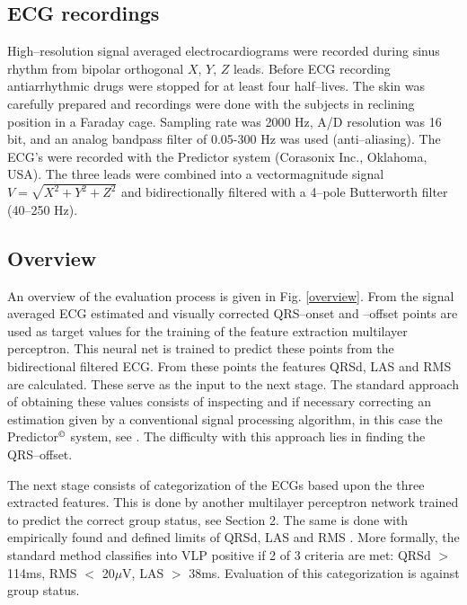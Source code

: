 \documentclass[twocolumn]{cinc}
\begin{document}
\subsection{ECG recordings}
High--resolution signal averaged electrocardiograms  
were recorded during sinus rhythm from bipolar orthogonal $X$, $Y$, $Z$ leads. 
Before ECG recording antiarrhythmic drugs were stopped for at least four half--lives.
The skin was carefully prepared and recordings were done with the subjects in reclining 
position in a Faraday cage. Sampling rate was 2000 Hz, A/D resolution was 16 bit, and an 
analog bandpass filter of 0.05-300 Hz was used (anti--aliasing).  The ECG's were recorded 
with the Predictor system (Corasonix Inc., Oklahoma, USA).   
The three leads were combined into a vectormagnitude signal $V=\sqrt{X^2 + Y^2 + Z^2}$ and
bidirectionally filtered with a 4--pole Butterworth filter (40--250 Hz). 



\subsection{Overview}

An overview of the evaluation process is given in Fig. \ref{overview}. From the signal averaged ECG
estimated and visually corrected QRS--onset and --offset points are used as target values for the 
training of the feature extraction multilayer perceptron. This neural net is trained to predict these
points from the bidirectional filtered ECG. From these points the features QRSd, LAS and RMS are
calculated. These serve as the input to the next stage. The standard approach of obtaining these
values consists of inspecting and if necessary correcting an estimation given by a conventional
signal processing algorithm, in this case the Predictor$^\copyright$ system, see \cite{med:breithardt91}. 
The difficulty with this approach lies in finding the QRS--offset. 

The next stage consists of categorization of the ECGs based upon the three extracted features. This
is done by another multilayer perceptron network trained to predict the correct group status, see Section 2.
The same is done with empirically found and defined limits of QRSd, LAS and RMS \cite{med:breithardt91}.
More formally, the standard method classifies into VLP positive if 2 of 3 
criteria are met: QRSd $>$ 114ms, RMS $<$ 20$\mu$V, LAS $>$ 38ms. Evaluation of this categorization
is against group status.

\begin{figure*}[h] 
\vspace*{-2cm}
\centerline{}
\caption{Overview of the decision process incorporating neural and standard methods.}
\label{overview} %
\end{figure*}
\end{document}
